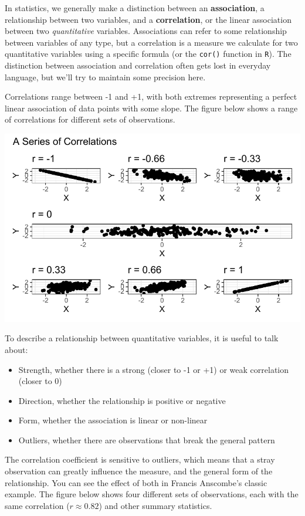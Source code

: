 \documentclass[
  letterpaper,
]{book}
\providecommand{\tightlist}{%
  \setlength{\itemsep}{0pt}\setlength{\parskip}{0pt}}\usepackage{longtable,booktabs,array}
\begin{document}
In statistics, we generally make a distinction between an
\textbf{association}, a relationship between two variables, and a
\textbf{correlation}, or the linear association between two
\emph{quantitative} variables. Associations can refer to some
relationship between variables of any type, but a correlation is a
measure we calculate for two quantitative variables using a specific
formula (or the \texttt{cor()} function in \texttt{R}). The distinction
between association and correlation often gets lost in everyday
language, but we'll try to maintain some precision here.

Correlations range between -1 and +1, with both extremes representing a
perfect linear association of data points with some slope. The figure
below shows a range of correlations for different sets of observations.

\includegraphics{visualizing-with-ggplot_files/figure-pdf/unnamed-chunk-6-1.pdf}

To describe a relationship between quantitative variables, it is useful
to talk about:

\begin{itemize}
\tightlist
\item
  Strength, whether there is a strong (closer to -1 or +1) or weak
  correlation (closer to 0)
\item
  Direction, whether the relationship is positive or negative
\item
  Form, whether the association is linear or non-linear
\item
  Outliers, whether there are observations that break the general
  pattern
\end{itemize}

The correlation coefficient is sensitive to outliers, which means that a
stray observation can greatly influence the measure, and the general
form of the relationship. You can see the effect of both in Francis
Anscombe's classic example. The figure below shows four different sets
of observations, each with the same correlation (\(r \approx 0.82\)) and
other summary statistics.
\end{document}
